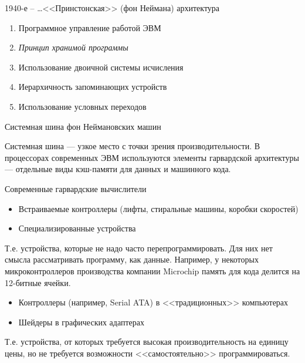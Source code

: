 \documentclass[xetex,aspectratio=43]{beamer}
\begin{document}
\begin{frame}{1940-е -- \ldots <<Принстонская>> (фон Неймана) архитектура}
	\begin{figure}
		
	\end{figure}

	\pause

	\begin{enumerate}
		\item
		Программное управление работой ЭВМ
		\item
		\em{Принцип хранимой программы}
		\item
		Использование двоичной системы исчисления
		\item
		Иерархичность запоминающих устройств
		\item
		Использование условных переходов
	\end{enumerate}
\end{frame}

\begin{frame}{Системная шина фон Неймановских машин}
		\begin{figure}
			
		\end{figure}

		\pause

		Системная шина --- узкое место с точки зрения производительности. В
		процессорах современных ЭВМ используются элементы гарвардской
		архитектуры --- отдельные виды кэш-памяти для данных и машинного кода.
\end{frame}

\begin{frame}{Современные гарвардские вычислители}
	\begin{itemize}
		\item
		Встраиваемые контроллеры (лифты, стиральные машины, коробки скоростей)
		\item
		Специализированные устройства
	\end{itemize}

		Т.е. устройства, которые не надо часто перепрограммировать. Для них нет
		смысла рассматривать программу, как данные. Например, у некоторых
		микроконтроллеров производства компании Microchip память для кода
		делится на 12-битные ячейки.

	\pause

	\begin{itemize}
		\item Контроллеры (например, Serial ATA) в <<традиционных>> компьютерах
		\item Шейдеры в графических адаптерах
	\end{itemize}

	Т.е. устройства, от которых требуется высокая производительность на единицу цены,
	но не требуется возможности <<самостоятельно>> программироваться.

\end{frame}
\end{document}
